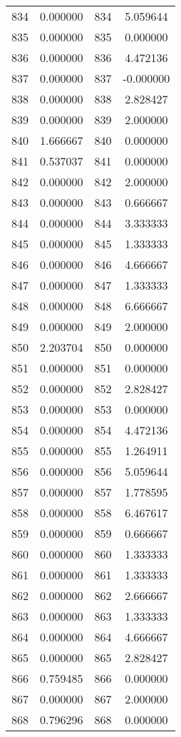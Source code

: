 \documentclass[12pt]{article}
\begin{document}
\begin{longtable}{@{}cccc@{}}
834 & 0.000000 & 834 & 5.059644 \\
835 & 0.000000 & 835 & 0.000000 \\
836 & 0.000000 & 836 & 4.472136 \\
837 & 0.000000 & 837 & -0.000000 \\
838 & 0.000000 & 838 & 2.828427 \\
839 & 0.000000 & 839 & 2.000000 \\
840 & 1.666667 & 840 & 0.000000 \\
841 & 0.537037 & 841 & 0.000000 \\
842 & 0.000000 & 842 & 2.000000 \\
843 & 0.000000 & 843 & 0.666667 \\
844 & 0.000000 & 844 & 3.333333 \\
845 & 0.000000 & 845 & 1.333333 \\
846 & 0.000000 & 846 & 4.666667 \\
847 & 0.000000 & 847 & 1.333333 \\
848 & 0.000000 & 848 & 6.666667 \\
849 & 0.000000 & 849 & 2.000000 \\
850 & 2.203704 & 850 & 0.000000 \\
851 & 0.000000 & 851 & 0.000000 \\
852 & 0.000000 & 852 & 2.828427 \\
853 & 0.000000 & 853 & 0.000000 \\
854 & 0.000000 & 854 & 4.472136 \\
855 & 0.000000 & 855 & 1.264911 \\
856 & 0.000000 & 856 & 5.059644 \\
857 & 0.000000 & 857 & 1.778595 \\
858 & 0.000000 & 858 & 6.467617 \\
859 & 0.000000 & 859 & 0.666667 \\
860 & 0.000000 & 860 & 1.333333 \\
861 & 0.000000 & 861 & 1.333333 \\
862 & 0.000000 & 862 & 2.666667 \\
863 & 0.000000 & 863 & 1.333333 \\
864 & 0.000000 & 864 & 4.666667 \\
865 & 0.000000 & 865 & 2.828427 \\
866 & 0.759485 & 866 & 0.000000 \\
867 & 0.000000 & 867 & 2.000000 \\
868 & 0.796296 & 868 & 0.000000 \\

\end{longtable}
\end{document}
